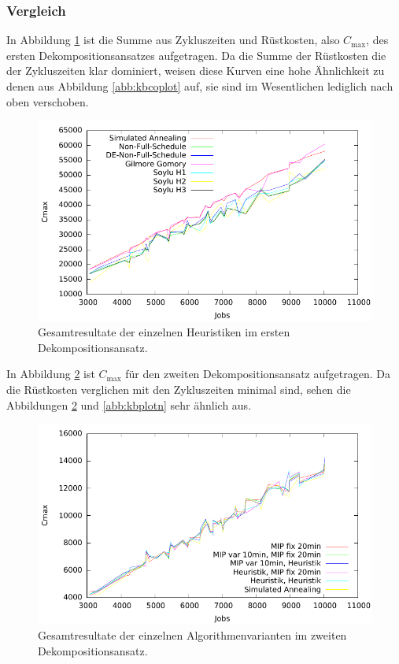 \documentclass{scrreprt}
\begin{document}
\subsubsection{Vergleich}
In Abbildung \ref{abb:kbcmaxplot} ist die Summe aus Zykluszeiten und Rüstkosten, also $C_{\max}$, des ersten Dekompositionsansatzes aufgetragen.
Da die Summe der Rüstkosten die der Zykluszeiten klar dominiert, weisen diese Kurven eine hohe Ähnlichkeit zu denen aus Abbildung \ref{abb:kbcoplot} auf,
sie sind im Wesentlichen lediglich nach oben verschoben.
\begin{figure}
    \begin{center}
        \includegraphics[width=.8\textwidth]{../prog/heuristics/plots/kbcmaxplot.pdf}
    \end{center}
    \caption{
        \label{abb:kbcmaxplot}
        Gesamtresultate der einzelnen Heuristiken im ersten Dekompositionsansatz.
    }
\end{figure}

In Abbildung \ref{abb:kbplotcmaxn} ist $C_{\max}$ für den zweiten Dekompositionsansatz aufgetragen.
Da die Rüstkosten verglichen mit den Zykluszeiten minimal sind, sehen die Abbildungen \ref{abb:kbplotcmaxn} und \ref{abb:kbplotn} sehr ähnlich aus.
\begin{figure}
    \begin{center}
        \includegraphics[width=.8\textwidth]{../prog/binpacking/results/kbplotcmaxn.pdf}
    \end{center}
    \caption{
        \label{abb:kbplotcmaxn}
        Gesamtresultate der einzelnen Algorithmenvarianten im zweiten Dekompositionsansatz.
    }
\end{figure}
\end{document}
